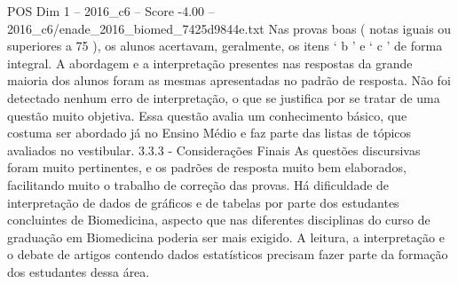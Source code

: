 \begin{textsample}{POS Dim 1 – 2016\_c6 – Score -4.00 – 2016\_c6/enade\_2016\_biomed\_7425d9844e.txt}
Nas provas boas ( notas iguais ou superiores a 75 ), os alunos acertavam, geralmente, os itens ‘ b ’ e ‘ c ’ de forma integral.
A abordagem e a interpretação presentes nas respostas da grande maioria dos alunos foram as mesmas apresentadas no padrão de resposta.
Não foi detectado nenhum erro de interpretação, o que se justifica por se tratar de uma questão muito objetiva.
Essa questão avalia um conhecimento básico, que costuma ser abordado já no Ensino Médio e faz parte das listas de tópicos avaliados no vestibular. 3.3.3 - Considerações Finais As questões discursivas foram muito pertinentes, e os padrões de resposta muito bem elaborados, facilitando muito o trabalho de correção das provas.
Há dificuldade de interpretação de dados de gráficos e de tabelas por parte dos estudantes concluintes de Biomedicina, aspecto que nas diferentes disciplinas do curso de graduação em Biomedicina poderia ser mais exigido.
A leitura, a interpretação e o debate de artigos contendo dados estatísticos precisam fazer parte da formação dos estudantes dessa área.

\end{textsample}
